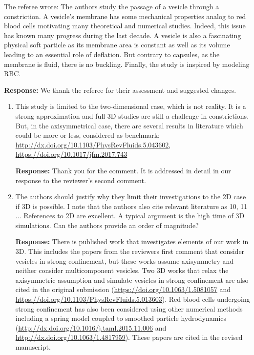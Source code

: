 \documentclass[11pt]{article}
\begin{document}
The referee wrote: The authors study the passage of a vesicle through a
constriction. A vesicle’s membrane has some mechanical properties analog
to red blood cells motivating many theoretical and numerical studies.
Indeed, this issue has known many progress during the last decade. A
vesicle is also a fascinating physical soft particle as its membrane
area is constant as well as its volume leading to an essential role of
deflation. But contrary to capsules, as the membrane is fluid, there is
no buckling. Finally, the study is inspired by modeling RBC. 

\noindent
{\bf Response:} We thank the referee for their assessment and suggested
changes.

\begin{enumerate}
\item This study is limited to the two-dimensional case, which is not
  reality. It is a strong approximation and full 3D studies are still a
    challenge in constrictions. But, in the axisymmetrical case, there
    are several results in literature which could be more or less,
    considered as benchmark:
    \url{http://dx.doi.org/10.1103/PhysRevFluids.5.043602}, \\
    \url{https://doi.org/10.1017/jfm.2017.743}

\noindent
{\bf Response:} Thank you for the comment. It is addressed in detail in
our response to the reviewer's second comment.

\item The authors should justify why they limit their investigations to
  the 2D case if 3D is possible. I note that the authors also cite
    relevant literature as 10, 11 $\ldots$ References to 2D are
    excellent. A typical argument is the high time of 3D simulations.
    Can the authors provide an order of magnitude?

\noindent
{\bf Response:} There is published work that investigates elements of
our work in  3D. This includes the papers from the reviewers first
comment that consider vesicles in strong confinement, but these works
assume axisymmetry and neither consider multicomponent vesicles. Two 3D
works that relax the axisymmetric assumption and simulate vesicles in
strong confinement are also cited in the original submission
(\url{https://doi.org/10.1063/1.5081057} and
\url{https://doi.org/10.1103/PhysRevFluids.5.013603}). Red blood cells
undergoing strong confinement has also been considered using other
numerical methods including a spring model coupled to smoothed particle
hydrodynamics (\url{http://dx.doi.org/10.1016/j.taml.2015.11.006} and
\url{http://dx.doi.org/10.1063/1.4817959}). These papers are cited in
the revised manuscript.


\end{enumerate}
\end{document}
